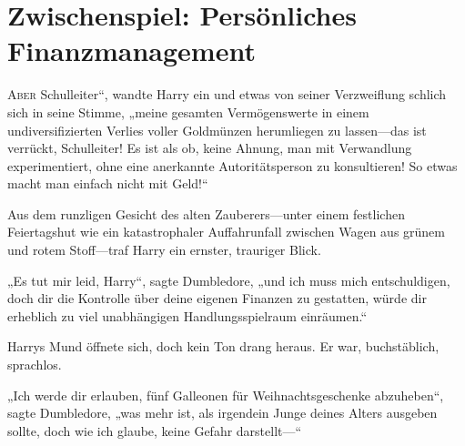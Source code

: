 \chapter{Zwischenspiel: Persönliches Finanzmanagement}
\lettrine[ante=„]{A}{ber} Schulleiter“, wandte Harry ein und etwas von seiner Verzweiflung schlich sich in seine Stimme, „meine gesamten Vermögenswerte in einem undiversifizierten Verlies voller Goldmünzen herumliegen zu lassen—das ist verrückt, Schulleiter! Es ist als ob, keine Ahnung, man mit Verwandlung experimentiert, ohne eine anerkannte Autoritätsperson zu konsultieren! So etwas macht man einfach nicht mit Geld!“

Aus dem runzligen Gesicht des alten Zauberers—unter einem festlichen Feiertagshut wie ein katastrophaler Auffahrunfall zwischen Wagen aus grünem und rotem Stoff—traf Harry ein ernster, trauriger Blick.

„Es tut mir leid, Harry“, sagte Dumbledore, „und ich muss mich entschuldigen, doch dir die Kontrolle über deine eigenen Finanzen zu gestatten, würde dir erheblich zu viel unabhängigen Handlungsspielraum einräumen.“

Harrys Mund öffnete sich, doch kein Ton drang heraus. Er war, buchstäblich, sprachlos.

„Ich werde dir erlauben, fünf Galleonen für Weihnachtsgeschenke abzuheben“, sagte Dumbledore, „was mehr ist, als irgendein Junge deines Alters ausgeben sollte, doch wie ich glaube, keine Gefahr darstellt—“

